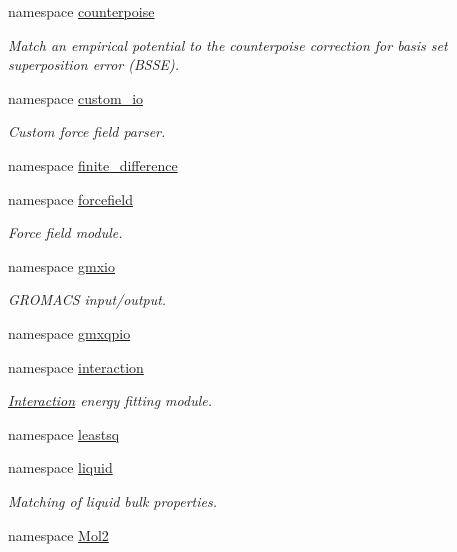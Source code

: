 \begin{DoxyCompactItemize}
\item 
namespace \hyperlink{namespaceforcebalance_1_1counterpoise}{counterpoise}
\begin{DoxyCompactList}\small\item\em \-Match an empirical potential to the counterpoise correction for basis set superposition error (\-B\-S\-S\-E). \end{DoxyCompactList}\item 
namespace \hyperlink{namespaceforcebalance_1_1custom__io}{custom\-\_\-io}
\begin{DoxyCompactList}\small\item\em \-Custom force field parser. \end{DoxyCompactList}\item 
namespace \hyperlink{namespaceforcebalance_1_1finite__difference}{finite\-\_\-difference}
\item 
namespace \hyperlink{namespaceforcebalance_1_1forcefield}{forcefield}
\begin{DoxyCompactList}\small\item\em \-Force field module. \end{DoxyCompactList}\item 
namespace \hyperlink{namespaceforcebalance_1_1gmxio}{gmxio}
\begin{DoxyCompactList}\small\item\em \-G\-R\-O\-M\-A\-C\-S input/output. \end{DoxyCompactList}\item 
namespace \hyperlink{namespaceforcebalance_1_1gmxqpio}{gmxqpio}
\item 
namespace \hyperlink{namespaceforcebalance_1_1interaction}{interaction}
\begin{DoxyCompactList}\small\item\em \hyperlink{classforcebalance_1_1interaction_1_1Interaction}{\-Interaction} energy fitting module. \end{DoxyCompactList}\item 
namespace \hyperlink{namespaceforcebalance_1_1leastsq}{leastsq}
\item 
namespace \hyperlink{namespaceforcebalance_1_1liquid}{liquid}
\begin{DoxyCompactList}\small\item\em \-Matching of liquid bulk properties. \end{DoxyCompactList}\item 
namespace \hyperlink{namespaceforcebalance_1_1Mol2}{\-Mol2}
\item 

\end{DoxyCompactItemize}
